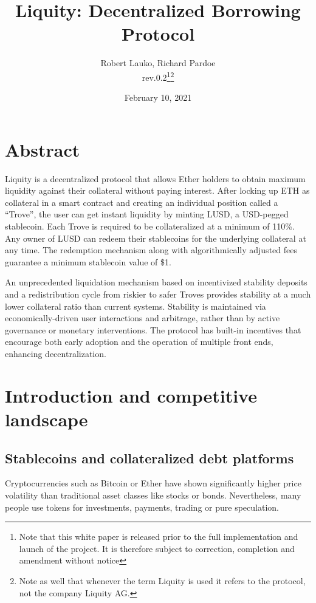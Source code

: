 \documentclass{article}
\begin{document}
\title{\textbf{Liquity: Decentralized Borrowing Protocol}}
\author{Robert Lauko, Richard Pardoe \\ rev.0.2\footnote{Note that this white paper is released prior to the full implementation and launch of the project. It is therefore subject to correction, completion and amendment without notice}\footnote{Note as well that whenever the term Liquity is used it refers to the protocol, not the company Liquity AG.}}
\date{February 10, 2021}

\maketitle

\section*{Abstract}
Liquity is a decentralized protocol that allows Ether holders to obtain maximum liquidity against their collateral without paying interest. After locking up ETH as collateral in a smart contract and creating an individual position called a “Trove”, the user can get instant liquidity by minting LUSD, a USD-pegged stablecoin. Each Trove is required to be collateralized at a minimum of 110\%. Any owner of LUSD can redeem their stablecoins for the underlying collateral at any time. The redemption mechanism along with algorithmically adjusted fees guarantee a minimum stablecoin value of \$1. 

An unprecedented liquidation mechanism based on incentivized stability deposits and a redistribution cycle from riskier to safer Troves provides stability at a much lower collateral ratio than current systems. Stability is maintained via economically-driven user interactions and arbitrage, rather than by active governance or monetary interventions. 
The protocol has built-in incentives that encourage both early adoption and the operation of multiple front ends, enhancing decentralization.

\newpage

\tableofcontents

\section{Introduction and competitive landscape}

\subsection{Stablecoins and collateralized debt platforms}
Cryptocurrencies such as Bitcoin or Ether have shown significantly higher price volatility than traditional asset classes like stocks or bonds. Nevertheless, many people use tokens for investments, payments, trading or pure speculation.
\end{document}
